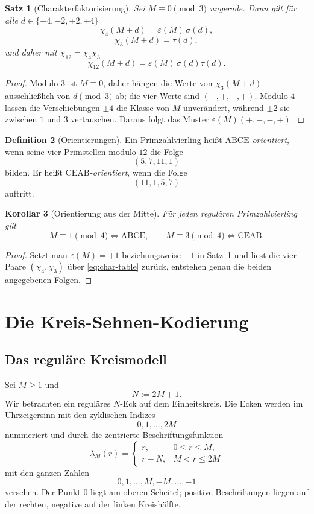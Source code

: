 \documentclass[11pt,a4paper]{article}
\newtheorem{satz}{Satz}[section]
\newtheorem{korollar}[satz]{Korollar}
\theoremstyle{definition}
\newtheorem{definition}[satz]{Definition}
\theoremstyle{remark}
\newcommand{\eps}{\varepsilon}
\newcommand{\ABCE}{\mathrm{ABCE}}
\newcommand{\CEAB}{\mathrm{CEAB}}
\begin{document}
\begin{satz}[Charakterfaktorisierung]\label{thm:char-factor}
Sei $M\equiv0\pmod3$ ungerade. Dann gilt für alle $d\in\{-4,-2,+2,+4\}$
\[
\boxed{\chi_4(M+d)=\eps(M)\,\sigma(d),}
\]
\[
\boxed{\chi_3(M+d)=\tau(d),}
\]
und daher mit $\chi_{12}=\chi_4\chi_3$
\[
\boxed{\chi_{12}(M+d)=\eps(M)\,\sigma(d)\tau(d).}
\]
\end{satz}

\begin{proof}
Modulo $3$ ist $M\equiv0$, daher hängen die Werte von $\chi_3(M+d)$ ausschließlich von $d\pmod3$ ab; die vier Werte sind $(-,+,-,+)$. Modulo $4$ lassen die Verschiebungen $\pm4$ die Klasse von $M$ unverändert, während $\pm2$ sie zwischen $1$ und $3$ vertauschen. Daraus folgt das Muster $\eps(M)(+,-,-,+)$.
\end{proof}

\begin{definition}[Orientierungen]
Ein Primzahlvierling heißt \emph{$\ABCE$-orientiert}, wenn seine vier Primstellen modulo $12$ die Folge
\[
(5,7,11,1)
\]
bilden. Er heißt \emph{$\CEAB$-orientiert}, wenn die Folge
\[
(11,1,5,7)
\]
auftritt.
\end{definition}

\begin{korollar}[Orientierung aus der Mitte]\label{cor:orientation}
Für jeden regulären Primzahlvierling gilt
\[
\boxed{M\equiv1\pmod4\iff \ABCE,}
\qquad
\boxed{M\equiv3\pmod4\iff \CEAB.}
\]
\end{korollar}

\begin{proof}
Setzt man $\eps(M)=+1$ beziehungsweise $-1$ in Satz~\ref{thm:char-factor} und liest die vier Paare $(\chi_4,\chi_3)$ über \eqref{eq:char-table} zurück, entstehen genau die beiden angegebenen Folgen.
\end{proof}

\section{Die Kreis-Sehnen-Kodierung}

\subsection{Das reguläre Kreismodell}

Sei $M\ge1$ und
\[
N:=2M+1.
\]
Wir betrachten ein reguläres $N$-Eck auf dem Einheitskreis. Die Ecken werden im Uhrzeigersinn mit den zyklischen Indizes
\[
0,1,\ldots,2M
\]
nummeriert und durch die zentrierte Beschriftungsfunktion
\[
\lambda_M(r)=
\begin{cases}
r,&0\le r\le M,\\
r-N,&M<r\le2M
\end{cases}
\]
mit den ganzen Zahlen
\[
0,1,\ldots,M,-M,\ldots,-1
\]
versehen. Der Punkt $0$ liegt am oberen Scheitel; positive Beschriftungen liegen auf der rechten, negative auf der linken Kreishälfte.
\end{document}
